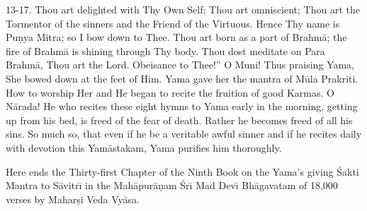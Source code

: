 13-17. Thou art delighted with Thy Own Self; Thou art omniscient; Thou art the Tormentor of the sinners and the Friend of the Virtuous. Hence Thy name is Pu\d{n}ya Mitra; so I bow down to Thee. Thou art born as a part of Brahm\=a; the fire of Brahm\=a is shining through Thy body. Thou dost meditate on Para Brahm\=a, Thou art the Lord. Obeisance to Thee!'' O Muni! Thus praising Yama, She bowed down at the feet of Him. Yama gave her the mantra of M\=ula Prakriti. How to worship Her and He began to recite the fruition of good Karmas. O N\=arada! He who recites these eight hymns to Yama early in the morning, getting up from his bed, is freed of the fear of death. Rather he becomes freed of all his sins. So much so, that even if he be a veritable awful sinner and if he recites daily with devotion this Yam\=astakam, Yama purifies him thoroughly.

Here ends the Thirty-first Chapter of the Ninth Book on the Yama's giving \'Sakti Mantra to S\=avitr\={\i} in the Mah\=apur\=a\d{n}am \'Sr\={\i} Mad Dev\={\i} Bh\=agavatam of 18,000 verses by Mahar\d{s}i Veda Vy\=asa.



